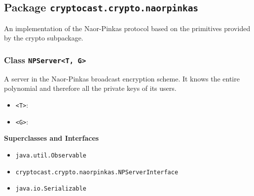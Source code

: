 \subsection{Package \lstinline!cryptocast.crypto.naorpinkas!}
An implementation of the Naor-Pinkas protocol based on the primitives provided by the crypto
 subpackage.

\subsubsection{Class \lstinline|NPServer<T, G>|}
A server in the Naor-Pinkas broadcast encryption scheme. It knows
 the entire polynomial and therefore all the private keys of its users. \\
\noindent\begin{minipage}[t]{5cm}
\vspace{0.3em}
\hspace*{2em}
\vspace{0.3em}
\end{minipage}

\begin{itemize}
\item \lstinline|<T>|: 
\item \lstinline|<G>|: 
\end{itemize}


\textbf{\sffamily Superclasses and Interfaces}
\begin{itemize}
\item \lstinline|java.util.Observable|
\item \lstinline|cryptocast.crypto.naorpinkas.NPServerInterface|
\item \lstinline|java.io.Serializable|
\end{itemize}


